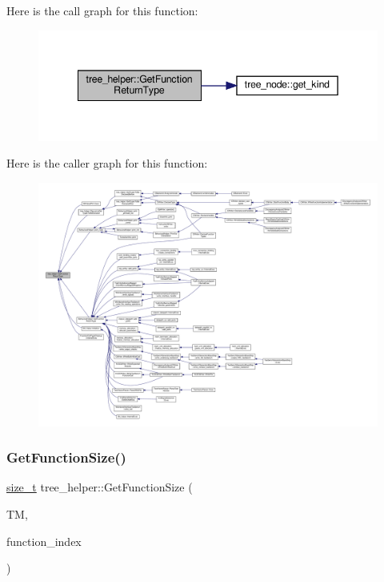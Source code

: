 Here is the call graph for this function\+:
\nopagebreak
\begin{figure}[H]
\begin{center}
\leavevmode
\includegraphics[width=342pt]{d7/d99/classtree__helper_a9e9972b08d71d6f422189619714c5067_cgraph}
\end{center}
\end{figure}
Here is the caller graph for this function\+:
\nopagebreak
\begin{figure}[H]
\begin{center}
\leavevmode
\includegraphics[width=350pt]{d7/d99/classtree__helper_a9e9972b08d71d6f422189619714c5067_icgraph}
\end{center}
\end{figure}
\mbox{\label{classtree__helper_afc5e0c0d06c70f6194841d56879fc6e5}} 
\subsubsection{\texorpdfstring{Get\+Function\+Size()}{GetFunctionSize()}}
{\footnotesize\ttfamily \hyperlink{tutorial__fpt__2017_2intro_2sixth_2test_8c_a7c94ea6f8948649f8d181ae55911eeaf}{size\+\_\+t} tree\+\_\+helper\+::\+Get\+Function\+Size (\begin{DoxyParamCaption}\item[{const \hyperlink{tree__manager_8hpp_a792e3f1f892d7d997a8d8a4a12e39346}{tree\+\_\+manager\+Const\+Ref} \&}]{TM,  }\item[{const unsigned int}]{function\+\_\+index }\end{DoxyParamCaption})\hspace{0.3cm}{\ttfamily [static]}}



